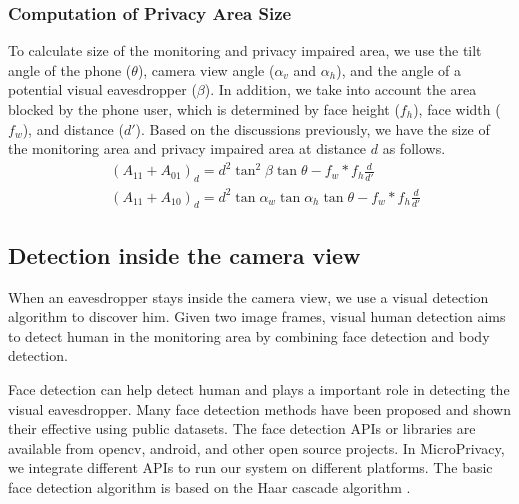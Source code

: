 \subsubsection{Computation of Privacy Area Size }
To calculate size of the monitoring and privacy impaired area, we use the tilt angle of the phone ($\theta$), camera view angle ($\alpha_v$ and $\alpha_h$), and the  angle of a potential visual eavesdropper ($\beta$). In addition, we take into account the area blocked by the phone user, which is determined by  face height ($f_h$), face width ($f_w$), and distance ($d'$).
Based on the discussions previously, we have the  size of the monitoring area and privacy impaired area at distance $d$ as follows.
\begin{equation}
\begin{split}
& (A_{11}+A_{01})_d=d^2\tan^2\beta\tan\theta-f_w*f_h\frac{d}{d'}\\ %
& (A_{11}+A_{10})_d=d^2\tan\alpha_w\tan\alpha_h\tan\theta-f_w*f_h\frac{d}{d'} %
\end{split}
\end{equation}


\subsection{Detection inside the camera view}
When an eavesdropper stays inside the camera view, we use a visual detection algorithm to discover him.
Given two image frames, visual human detection  aims to detect human in the monitoring area by combining face detection and body detection.

Face detection can help detect human and plays a important role in detecting the visual eavesdropper. Many face detection methods have been proposed \cite{viola2004robust} and shown their effective using public datasets. The face detection APIs or libraries are available from opencv\cite{opencvFace}, android\cite{androidFaceAPI}, and other open source projects\cite{MicrosoftFace}. In MicroPrivacy, we integrate different APIs to run our system on different platforms. The basic face detection algorithm is based on the Haar cascade algorithm \cite{viola2004robust}.

